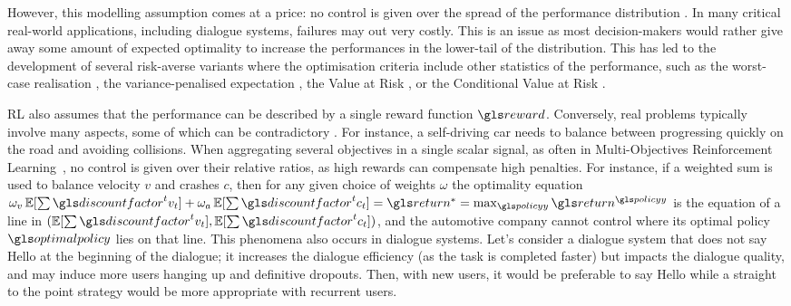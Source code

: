 However, this modelling assumption comes at a price: no control is given over the spread of the performance distribution \parencite{Dann2018}. In many critical real-world applications, including dialogue systems, failures may  out very costly. This is an issue as most decision-makers would rather give away some amount of expected optimality to increase the performances in the lower-tail of the distribution. This has led to the development of several risk-averse variants where the optimisation criteria include other statistics of the performance, such as the worst-case realisation \parencite{Iyengar2005,Nilim2005,Wiesemann2013}, the variance-penalised expectation \parencite{Tamar2012,Garcia2015}, the Value at Risk \parencite{Mausser2003,Luenberger2013}, or the Conditional Value at Risk \parencite{Chow2014,ChowGJP15}.

\acrlong{RL} also assumes that the performance can be described by a single reward function $\reward$. Conversely, real problems typically involve many aspects, some of which can be contradictory \parencite{Liu2014}. For instance, a self-driving car needs to balance between progressing quickly on the road and avoiding collisions. When aggregating several objectives in a single scalar signal, as often in Multi-Objectives Reinforcement Learning~\parencite{Roijers2013ASO}, no control is given over their relative ratios, as high rewards can compensate high penalties. For instance, if a weighted sum is used to balance velocity $v$ and crashes $c$, then for any given choice of weights $\omega$ the optimality equation $\omega_v\expectedvalue[\sum\discountfactor^t v_t] + \omega_a\expectedvalue[\sum\discountfactor^t c_t] = \return^* = \max_{\policy} \return^{\policy}$ is the equation of a line in $(\expectedvalue[\sum\discountfactor^t v_t], \expectedvalue[\sum\discountfactor^t c_t])$, and the automotive company cannot control where its optimal policy $\optimalpolicy$ lies on that line. This phenomena also occurs in dialogue systems. Let's consider a dialogue system that does not say Hello at the beginning of the dialogue; it increases the dialogue efficiency (as the task is completed faster) but impacts the dialogue quality, and may induce more users hanging up and definitive dropouts. Then, with new users, it would be preferable to say Hello while a straight to the point strategy would be more appropriate with recurrent users.

